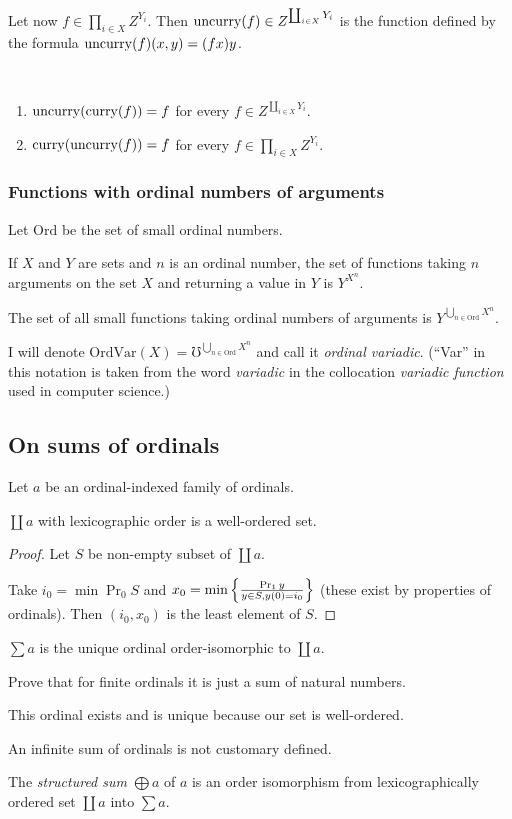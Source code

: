 Let now $f\in\prod_{i\in X}Z^{Y_{i}}$. Then $\operatorname{uncurry}(f)\in Z^{\coprod_{i\in X}Y_{i}}$
is the function defined by the formula $\operatorname{uncurry}(f)(x,y)=(fx)y$.
\begin{obvious}
~
\begin{enumerate}
\item $\operatorname{uncurry}(\operatorname{curry}(f))=f$ for every $f\in Z^{\coprod_{i\in X}Y_{i}}$.
\item $\operatorname{curry}(\operatorname{uncurry}(f))=f$ for every $f\in\prod_{i\in X}Z^{Y_{i}}$.
\end{enumerate}
\end{obvious}

\subsubsection{Functions with ordinal numbers of arguments}

Let $\mathrm{Ord}$ be the set of small ordinal numbers.

If $X$ and $Y$ are sets and $n$ is an ordinal number, the set of
functions taking $n$ arguments on the set $X$ and returning a value
in $Y$ is $Y^{X^{n}}$.

The set of all small functions taking ordinal numbers of arguments
is $Y^{\bigcup_{n\in\mathrm{Ord}}X^{n}}$.

I will denote $\mathrm{OrdVar}(X)=\mho^{\bigcup_{n\in\mathrm{Ord}}X^{n}}$
and call it \emph{ordinal variadic}. (``Var'' in this notation is
taken from the word \emph{variadic} in the collocation \emph{variadic
function} used in computer science.)


\subsection{On sums of ordinals}

Let $a$ be an ordinal-indexed family of ordinals.
\begin{prop}
$\coprod a$ with lexicographic order is a well-ordered set.\end{prop}
\begin{proof}
Let $S$ be non-empty subset of $\coprod a$.

Take $i_{0}=\min\Pr_{0}S$ and $x_{0}=\min\left\{ \frac{\Pr_{1}y}{y\in S,y(0)=i_{0}}\right\}$
(these exist by properties of ordinals). Then $(i_{0},x_{0})$ is
the least element of $S$.\end{proof}
\begin{defn}
$\sum a$ is the unique ordinal order-isomorphic to $\coprod a$.\end{defn}
\begin{xca}
Prove that for finite ordinals it is just a sum of natural numbers.
\end{xca}
This ordinal exists and is unique because our set is well-ordered.
\begin{rem}
An infinite sum of ordinals is not customary defined.
\end{rem}
The \emph{structured sum} $\bigoplus a$ of
$a$ is an order isomorphism from lexicographically ordered set $\coprod a$
into $\sum a$.

